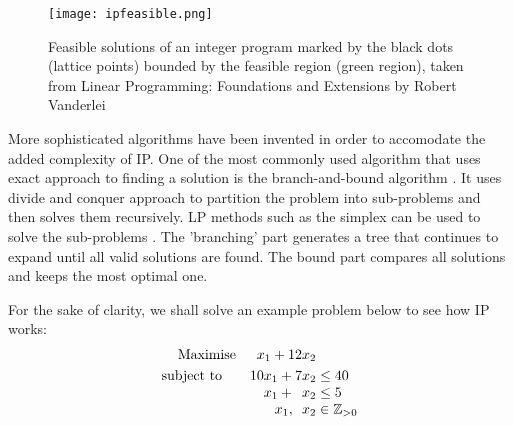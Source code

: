 \begin{figure}[!ht]
  \centering
    \texttt{[image: ipfeasible.png]}
    \caption{Feasible solutions of an integer program marked by the black dots (lattice points) bounded by the feasible region (green region), taken from
     Linear Programming: Foundations and Extensions by Robert Vanderlei \cite{Sottinen2009}}
\end{figure}

More sophisticated algorithms have been invented in order to accomodate the added complexity of IP. One of the most commonly
used algorithm that uses exact approach to finding a solution is the branch-and-bound algorithm  \cite{LPVanderbei, LPChvatal, Dastghaibifard2008}. It uses divide and
conquer approach to partition the problem into sub-problems
and then solves them recursively. LP methods such as the simplex can be used to solve the sub-problems \cite{Dastghaibifard2008}.
The 'branching' part generates a tree
that continues to expand until all valid solutions are found. The bound part compares all solutions and keeps the
most optimal one.

For the sake of clarity, we shall solve an example problem below \cite{LPVanderbei} to see how IP works:
\[
  \begin{array}{r@{}r@{}l}
    \text{Maximise} \quad &{}x_{1} + 12x_{2} \\[\jot]
    \text{subject to}\qquad &{}10x_{1} +   7x_{2} &{} \leq 40 \\
    \qquad &{} x_{1} +   \phantom{2}x_{2} &{} \leq 5 \\
    \qquad &{} x_{1} ,   \phantom{2}x_{2} &{} \in \mathbb{Z}_{>0}\\
  \end{array}
\]

